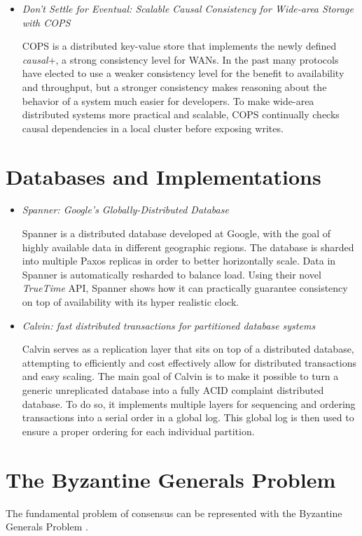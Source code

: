 \documentclass{article}
\begin{document}
\begin{itemize}
	\item
	\textit{Don't Settle for Eventual: Scalable Causal Consistency for Wide-area Storage with COPS} \cite{LloydCOPS}

	COPS is a distributed key-value store that implements the newly defined \textit{causal}+, a strong consistency level for WANs.
	In the past many protocols have elected to use a weaker consistency level for the benefit to availability and throughput, but a stronger consistency makes reasoning about the behavior of a system much easier for developers.
	To make wide-area distributed systems more practical and scalable, COPS continually checks causal dependencies in a local cluster before exposing writes.



\end{itemize}

\section{Databases and Implementations}

\begin{itemize}

	\item
	\textit{Spanner: Google's Globally-Distributed Database} \cite{Spanner}

	Spanner is a distributed database developed at Google, with the goal of highly available data in different geographic regions.
	The database is sharded into multiple Paxos replicas in order to better horizontally scale. Data in Spanner is automatically resharded to balance load.
	Using their novel \textit{TrueTime} API, Spanner shows how it can practically guarantee consistency on top of availability with its hyper realistic clock.

	\item
	\textit{Calvin: fast distributed transactions for partitioned database systems} \cite{Calvin}

	Calvin serves as a replication layer that sits on top of a distributed database, attempting to efficiently and cost effectively allow for distributed transactions and easy scaling. The main goal of Calvin is to make it possible to turn a generic unreplicated database into a fully ACID complaint distributed database.
	To do so, it implements multiple layers for sequencing and ordering transactions into a serial order in a global log. This global log is then used to ensure a proper ordering for each individual partition.

\end{itemize}

\section{The Byzantine Generals Problem}

The fundamental problem of consensus can be represented with the Byzantine Generals Problem \cite{LamportGeneralsProblem}.



\end{document}
